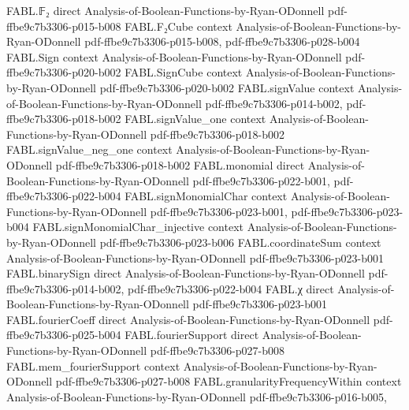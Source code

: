 \begin{theorem}
\label{FABL.signEquation_indicator}
\leanok
{}
\proofstep
  {FABL.𝔽₂}
  {direct}
  {Analysis-of-Boolean-Functions-by-Ryan-ODonnell}
  {pdf-ffbe9c7b3306-p015-b008}
\proofstep
  {FABL.F₂Cube}
  {context}
  {Analysis-of-Boolean-Functions-by-Ryan-ODonnell}
  {pdf-ffbe9c7b3306-p015-b008,
    pdf-ffbe9c7b3306-p028-b004}
\proofstep
  {FABL.Sign}
  {context}
  {Analysis-of-Boolean-Functions-by-Ryan-ODonnell}
  {pdf-ffbe9c7b3306-p020-b002}
\proofstep
  {FABL.SignCube}
  {context}
  {Analysis-of-Boolean-Functions-by-Ryan-ODonnell}
  {pdf-ffbe9c7b3306-p020-b002}
\proofstep
  {FABL.signValue}
  {context}
  {Analysis-of-Boolean-Functions-by-Ryan-ODonnell}
  {pdf-ffbe9c7b3306-p014-b002,
    pdf-ffbe9c7b3306-p018-b002}
\proofstep
  {FABL.signValue_one}
  {context}
  {Analysis-of-Boolean-Functions-by-Ryan-ODonnell}
  {pdf-ffbe9c7b3306-p018-b002}
\proofstep
  {FABL.signValue_neg_one}
  {context}
  {Analysis-of-Boolean-Functions-by-Ryan-ODonnell}
  {pdf-ffbe9c7b3306-p018-b002}
\proofstep
  {FABL.monomial}
  {direct}
  {Analysis-of-Boolean-Functions-by-Ryan-ODonnell}
  {pdf-ffbe9c7b3306-p022-b001,
    pdf-ffbe9c7b3306-p022-b004}
\proofstep
  {FABL.signMonomialChar}
  {context}
  {Analysis-of-Boolean-Functions-by-Ryan-ODonnell}
  {pdf-ffbe9c7b3306-p023-b001,
    pdf-ffbe9c7b3306-p023-b004}
\proofstep
  {FABL.signMonomialChar_injective}
  {context}
  {Analysis-of-Boolean-Functions-by-Ryan-ODonnell}
  {pdf-ffbe9c7b3306-p023-b006}
\proofstep
  {FABL.coordinateSum}
  {context}
  {Analysis-of-Boolean-Functions-by-Ryan-ODonnell}
  {pdf-ffbe9c7b3306-p023-b001}
\proofstep
  {FABL.binarySign}
  {direct}
  {Analysis-of-Boolean-Functions-by-Ryan-ODonnell}
  {pdf-ffbe9c7b3306-p014-b002,
    pdf-ffbe9c7b3306-p022-b004}
\proofstep
  {FABL.χ}
  {direct}
  {Analysis-of-Boolean-Functions-by-Ryan-ODonnell}
  {pdf-ffbe9c7b3306-p023-b001}
\proofstep
  {FABL.fourierCoeff}
  {direct}
  {Analysis-of-Boolean-Functions-by-Ryan-ODonnell}
  {pdf-ffbe9c7b3306-p025-b004}
\proofstep
  {FABL.fourierSupport}
  {direct}
  {Analysis-of-Boolean-Functions-by-Ryan-ODonnell}
  {pdf-ffbe9c7b3306-p027-b008}
\proofstep
  {FABL.mem_fourierSupport}
  {context}
  {Analysis-of-Boolean-Functions-by-Ryan-ODonnell}
  {pdf-ffbe9c7b3306-p027-b008}
\proofstep
  {FABL.granularityFrequencyWithin}
  {context}
  {Analysis-of-Boolean-Functions-by-Ryan-ODonnell}
  {pdf-ffbe9c7b3306-p016-b005,
}
\end{theorem}
